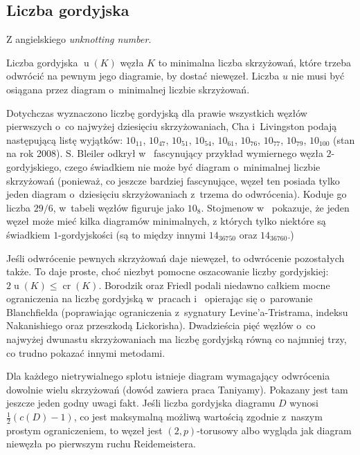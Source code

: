 
\subsection{Liczba gordyjska} %
\label{sub:unknotting_number}
Z angielskiego \emph{unknotting number}.

\begin{definition}
    Liczba gordyjska $\operatorname{u}(K)$ węzła $K$ to minimalna liczba skrzyżowań,
    które trzeba odwrócić na pewnym jego diagramie, by dostać niewęzeł.
    Liczba $u$ nie musi być osiągana przez diagram o~minimalnej liczbie skrzyżowań.
\end{definition}

Dotychczas wyznaczono liczbę gordyjską dla prawie wszystkich węzłów pierwszych o~co najwyżej dziesięciu skrzyżowaniach,
Cha i~Livingston podają następującą listę wyjątków:
$10_{11}$, $10_{47}$, $10_{51}$, $10_{54}$, $10_{61}$, $10_{76}$, $10_{77}$, $10_{79}$, $10_{100}$ (stan na rok 2008).
S. Bleiler odkrył w~\cite{bleiler84} fascynujący przykład wymiernego węzła $2$-gordyjskiego,
czego świadkiem nie może być diagram o~minimalnej liczbie skrzyżowań
(ponieważ, co jeszcze bardziej fascynujące, węzeł ten posiada tylko jeden diagram o~dziesięciu skrzyżowaniach z~trzema do odwrócenia).
Koduje go liczba $29/6$, w~tabeli węzłów figuruje jako $10_8$.
Stojmenow w~\cite{stoimenow01} pokazuje, że jeden węzeł może mieć kilka diagramów minimalnych,
z których tylko niektóre są świadkiem $1$-gordyjskości (są to między innymi $14_{36750}$ oraz $14_{36760}$.)

Jeśli odwrócenie pewnych skrzyżowań daje niewęzeł, to odwrócenie pozostałych także.
To daje proste, choć niezbyt pomocne oszacowanie liczby gordyjskiej: $2 \operatorname{u} (K) \le \operatorname{cr} (K)$.
Borodzik oraz Friedl podali niedawno całkiem mocne ograniczenia na liczbę gordyjską w~pracach \cite{borodzik14} i~\cite{borodzik15} opierając się o~parowanie Blanchfielda
(poprawiając ograniczenia z~sygnatury Levine'a-Tristrama, indeksu Nakanishiego oraz przeszkodą Lickorisha).
Dwadzieścia pięć węzłów o~co najwyżej dwunastu skrzyżowaniach ma liczbę gordyjską równą co najmniej trzy, co trudno pokazać innymi metodami.

Dla każdego nietrywialnego splotu istnieje diagram wymagający odwrócenia dowolnie wielu skrzyżowań (dowód zawiera praca \cite{taniyama09} Taniyamy).
Pokazany jest tam jeszcze jeden godny uwagi fakt.
Jeśli liczba gordyjska diagramu $D$ wynosi $\frac 12 (c(D) - 1)$,
co jest maksymalną możliwą wartością zgodnie z~naszym prostym ograniczeniem,
to węzeł jest $(2,p)$-torusowy albo wygląda jak diagram niewęzła po pierwszym ruchu Reidemeistera.

